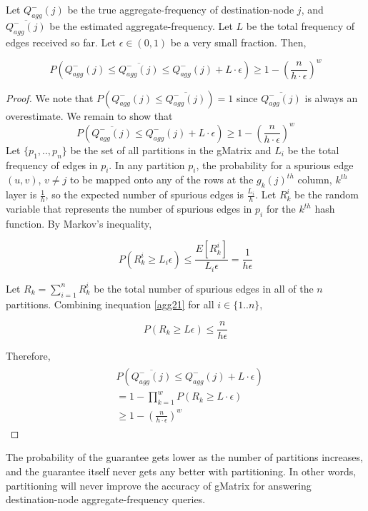 \begin{theorem}
\label{thm:agg2}
Let $Q_{agg}^{-}(j)$ be the true aggregate-frequency of destination-node $j$, and $\overline{Q_{agg}^{-}(j)}$ be the estimated aggregate-frequency. Let $L$ be the total frequency of edges received so far. Let $\epsilon \in (0,1)$ be a very small fraction. Then,
  
  \[
P(Q_{agg}^{-}(j) \leq \overline{Q_{agg}^{-}(j)} \leq Q_{agg}^{-}(j) + L \cdot \epsilon) \geq 1-(\frac{n}{h\cdot\epsilon})^w
\]

\end{theorem}

\begin{proof}
We note that $P(Q_{agg}^{-}(j) \leq \overline{Q_{agg}^{-}(j)}) = 1$ since $\overline{Q_{agg}^{-}(j)}$ is always an overestimate. We remain to show that
\[
P(\overline{Q_{agg}^{-}(j)} \leq Q_{agg}^{-}(j) + L \cdot \epsilon) \geq 1-(\frac{n}{h\cdot\epsilon})^w
\]
Let $\{p_1,..,p_n\}$ be the set of all partitions in the gMatrix and $L_i$ be the total frequency of edges in $p_i$. In any partition $p_i$, the probability for a spurious edge $(u,v)$, $v \neq j$ to be mapped onto any of the rows at the $g_k(j)^{th}$ column, $k^{th}$ layer is $\frac{1}{h}$, so the expected number of spurious edges is $\frac{L_i}{h}$. Let $R_k^i$ be the random variable that represents the number of spurious edges in $p_i$ for the $k^{th}$ hash function. By Markov's inequality,

\begin{equation} \label{agg21}
  P(R_k^i \geq L_i \epsilon) \leq \frac{E[R_k^i]}{L_i \epsilon} = \frac{1}{h\epsilon}
\end{equation}

Let $R_k = \sum_{i=1}^{n} R_k^i$ be the total number of spurious edges in all of the $n$ partitions. Combining inequation \ref{agg21} for all $i \in \{1..n\}$, 

\begin{equation} \label{agg22}
 P(R_k \geq L\epsilon) \leq \frac{n}{h\epsilon}
\end{equation}

Therefore,
\begin{align}
\begin{split}
&  P(\overline{Q_{agg}^{-}(j)} \leq Q_{agg}^{-}(j) + L \cdot \epsilon)
\\  &= 1 - \prod _{k=1}^{w}P(R_k \geq L \cdot \epsilon)
\\  &\geq 1-(\frac{n}{h\cdot\epsilon})^w
\end{split}
\end{align}

\end{proof}

\begin{remarks}
The probability of the guarantee gets lower as the number of partitions increases, and the guarantee itself never gets any better with partitioning. In other words, partitioning will never improve the accuracy of gMatrix for answering destination-node aggregate-frequency queries.
\end{remarks}
